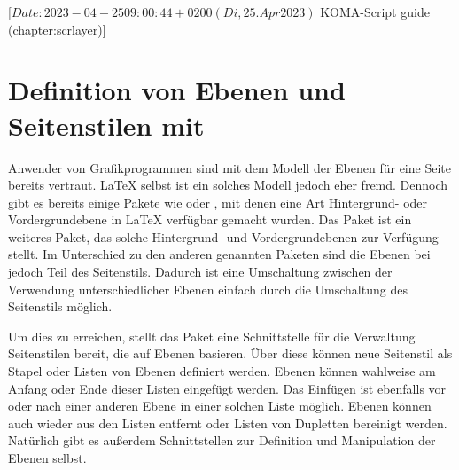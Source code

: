 %
%
%
%
%
%
%

%
                 [$Date: 2023-04-25 09:00:44 +0200 (Di, 25. Apr 2023) $
                  KOMA-Script guide (chapter:scrlayer)]

\chapter[{Definition von Ebenen und Seitenstilen mit \Package{scrlayer}}]
  {Definition von Ebenen und Seitenstilen
    mit }

\BeginIndexGroup
{}%
%
Anwender von Grafikprogrammen sind mit dem Modell der Ebenen für eine Seite
bereits vertraut. \LaTeX{} selbst ist ein solches Modell jedoch eher
fremd. Dennoch gibt es bereits einige Pakete wie  oder
, mit denen eine Art Hintergrund- oder
Vor\-der\-grund\-ebe\-ne in \LaTeX{} verfügbar gemacht wurden. Das Paket
 ist ein weiteres Paket, das solche Hintergrund- und
Vordergrundebenen zur Verfügung stellt. Im Unterschied zu den anderen
genannten Paketen sind die Ebenen bei  jedoch Teil des
Seitenstils. Dadurch ist eine Umschaltung zwischen der Verwendung
unterschiedlicher Ebenen einfach durch die Umschaltung des Seitenstils möglich.

Um dies zu erreichen, stellt das Paket eine Schnittstelle für die Verwaltung
Seitenstilen bereit, die auf Ebenen basieren. Über diese können neue
Seitenstil als Stapel oder Listen von Ebenen definiert werden. Ebenen können
wahlweise am Anfang oder Ende dieser Listen eingefügt werden. Das Einfügen ist
ebenfalls vor oder nach einer anderen Ebene in einer solchen Liste
möglich. Ebenen können auch wieder aus den Listen entfernt oder Listen von
Dupletten bereinigt werden. Natürlich gibt es außerdem Schnittstellen zur
Definition und Manipulation der Ebenen selbst.

